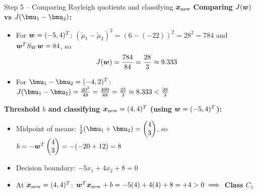\documentclass[aspectratio=169]{beamer}\usepackage[]{graphicx}\usepackage[]{xcolor}
\begin{document}
\begin{frame}{Step 5 -- Comparing Rayleigh quotients and classifying $\bm{x}_{\text{new}}$}
    \textbf{Comparing $J(\bm{w})$ vs $J(\bmu_1 - \bmu_2)$:}
    \begin{itemize}
        \item For $\bm{w} = (-5, 4)^T$: $(\tilde{\mu}_1 - \tilde{\mu}_2)^2 = (6 - (-22))^2 = 28^2 = 784$ and $\bm{w}^T S_W \bm{w} = 84$, so
        \[
            J(\bm{w}) = \frac{784}{84} = \frac{28}{3} \approx 9.333
        \]
        \item For $\bmu_1 - \bmu_2 = (-4, 2)^T$: $J(\bmu_1 - \bmu_2) = \frac{20^2}{48} = \frac{400}{48} = \frac{25}{3} \approx 8.333 < \frac{28}{3}$
    \end{itemize}
    \vfill
    \textbf{Threshold $b$ and classifying $\bm{x}_{\text{new}} = (4, 4)^T$ (using $\bm{w} = (-5, 4)^T$):}
    \begin{itemize}
        \item Midpoint of means: $\frac{1}{2}(\bmu_1 + \bmu_2) = \begin{pmatrix} 4 \\ 3 \end{pmatrix}$, so $b = -\bm{w}^T\begin{pmatrix} 4 \\ 3 \end{pmatrix} = -(-20 + 12) = 8$
        \item Decision boundary: $-5x_1 + 4x_2 + 8 = 0$
        \item At $\bm{x}_{\text{new}} = (4, 4)^T$: $\bm{w}^T \bm{x}_{\text{new}} + b = -5(4) + 4(4) + 8 = +4 > 0 \implies$ \textbf{Class $C_1$}
    \end{itemize}
\end{frame}
\end{document}
